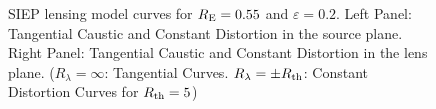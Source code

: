 \begin{figure}[!ht]
\caption{\label{siep_curves_pm-2} SIEP lensing model curves for $R_{\rm E}=0.55$
and $\varepsilon=0.2$. Left Panel: Tangential Caustic and Constant Distortion in
the source plane. Right Panel: Tangential Caustic and Constant Distortion in the
lens plane. ($R_\lambda=\infty$: Tangential Curves. $R_\lambda=\pm R_{\rm th}$:
Constant Distortion Curves for $R_{\rm th}=5$)}
\end{figure}

